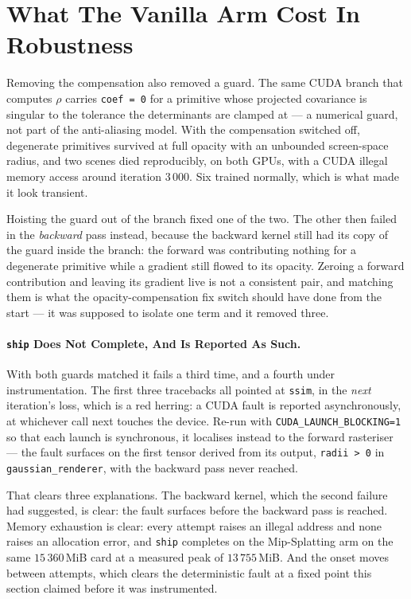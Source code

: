 \section{What The Vanilla Arm Cost In Robustness}
\label{sec:shipfails}

Removing the compensation also removed a guard. The same CUDA branch that
computes $\rho$ carries \texttt{coef = 0} for a primitive whose projected
covariance is singular to the tolerance the determinants are clamped at --- a
numerical guard, not part of the anti-aliasing model. With the compensation
switched off, degenerate primitives survived at full opacity with an unbounded
screen-space radius, and two scenes died reproducibly, on both GPUs, with a CUDA
illegal memory access around iteration $3\,000$. Six trained normally, which is
what made it look transient.

Hoisting the guard out of the branch fixed one of the two. The other then failed
in the \emph{backward} pass instead, because the backward kernel still had its
copy of the guard inside the branch: the forward was contributing nothing for a
degenerate primitive while a gradient still flowed to its opacity. Zeroing a
forward contribution and leaving its gradient live is not a consistent pair, and
matching them is what the opacity-compensation fix switch should have done from the start --- it was
supposed to isolate one term and it removed three.

\paragraph{\texttt{ship} Does Not Complete, And Is Reported As Such.} With both
guards matched it fails a third time, and a fourth under instrumentation. The
first three tracebacks all pointed at \texttt{ssim}, in the \emph{next}
iteration's loss, which is a red herring: a CUDA fault is reported
asynchronously, at whichever call next touches the device. Re-run with
\texttt{CUDA\_LAUNCH\_BLOCKING=1} so that each launch is synchronous, it
localises instead to the forward rasteriser --- the fault surfaces on the first
tensor derived from its output, \texttt{radii > 0} in
\texttt{gaussian\_renderer}, with the backward pass never reached.

That clears three explanations. The backward kernel, which the second failure
had suggested, is clear: the fault surfaces before the backward pass is reached.
Memory exhaustion is clear: every attempt raises an illegal address and none
raises an allocation error, and \texttt{ship} completes on the Mip-Splatting arm
on the same $15\,360$\,MiB card at a measured peak of $13\,755$\,MiB. And the
onset moves between attempts, which clears the deterministic fault at a fixed
point this section claimed before it was instrumented.

